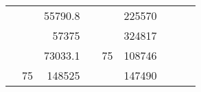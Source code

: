 \begin{table}[H]
\begin{tabular}{|ccrccrccc}
\multicolumn{1}{|c|}{\cellcolor[HTML]{FFFFC7}}                                & \multicolumn{1}{c|}{\cellcolor[HTML]{DAE8FC}}                      & \multicolumn{1}{r|}{\cellcolor[HTML]{DAE8FC}55790.8}   & \multicolumn{1}{c|}{\cellcolor[HTML]{FFFFC7}}                                & \multicolumn{1}{c|}{\cellcolor[HTML]{DAE8FC}}                       & \multicolumn{1}{r|}{\cellcolor[HTML]{DDFDFF}225570}    &                                                                              &                                                                    &                                                        \\ \cline{3-3} \cline{6-6}
\multicolumn{1}{|c|}{\cellcolor[HTML]{FFFFC7}}                                & \multicolumn{1}{c|}{\cellcolor[HTML]{DAE8FC}}                      & \multicolumn{1}{r|}{\cellcolor[HTML]{DDFDFF}57375}     & \multicolumn{1}{c|}{\cellcolor[HTML]{FFFFC7}}                                & \multicolumn{1}{c|}{\cellcolor[HTML]{DAE8FC}}                       & \multicolumn{1}{r|}{\cellcolor[HTML]{DAE8FC}324817}    &                                                                              &                                                                    &                                                        \\ \cline{3-3} \cline{6-6}
\multicolumn{1}{|c|}{\cellcolor[HTML]{FFFFC7}}                                & \multicolumn{1}{c|}{\cellcolor[HTML]{DAE8FC}}                      & \multicolumn{1}{r|}{\cellcolor[HTML]{DAE8FC}73033.1}   & \multicolumn{1}{c|}{\cellcolor[HTML]{FFFFC7}}                                & \multicolumn{1}{c|}{\multirow{-10}{*}{\cellcolor[HTML]{DAE8FC}75}}  & \multicolumn{1}{r|}{\cellcolor[HTML]{DDFDFF}108746}    &                                                                              &                                                                    &                                                        \\ \cline{3-3} \cline{5-6}
\multicolumn{1}{|c|}{\cellcolor[HTML]{FFFFC7}}                                & \multicolumn{1}{c|}{\multirow{-10}{*}{\cellcolor[HTML]{DAE8FC}75}} & \multicolumn{1}{r|}{\cellcolor[HTML]{DDFDFF}148525}    & \multicolumn{1}{c|}{\cellcolor[HTML]{FFFFC7}}                                & \multicolumn{1}{c|}{\cellcolor[HTML]{DDFDFF}}                       & \multicolumn{1}{r|}{\cellcolor[HTML]{DAE8FC}147490}    &                                                                              &                                                                    &                                                        \\ \cline{2-3} \cline{6-6}

\end{tabular}
\end{table}
